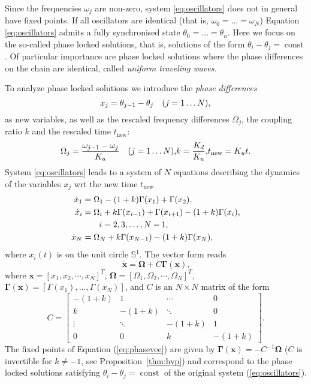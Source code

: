\documentclass[aps,pre,twocolumn,a4paper,showkeys,showpacs]{revtex4}\usepackage{color}
\theoremstyle{plain}
\theoremstyle{plain}
\begin{document}
\label{sec:phaselock}Since the frequencies $\omega_{j}$ are non-zero, system
\eqref{eq:oscillators} does not in general have fixed points. If all
oscillators are identical (that is, $\omega_{0}=\ldots=\omega_{N}$) Equation
\eqref{eq:oscillators} admits a fully synchronised state $\theta_{0}=\ldots=\theta_{n}$. Here we focus on the so-called phase locked solutions,
that is, solutions of the form $\theta_{i}-\theta_{j}=\operatorname{const}$.
Of particular importance are phase locked solutions where the phase
differences on the chain are identical, called \textit{uniform traveling
waves.}

To analyze phase locked solutions we introduce the \emph{phase differences}
\begin{equation}
x_{j}=\theta_{j-1}-\theta_{j}\mbox{\quad(\ensuremath{j=1\ldots N})},\label{eq:phasediff}\end{equation}
as new variables, as well as the rescaled frequency differences $\Omega_{j}$,
the coupling ratio $k$ and the rescaled time $t_{\mathrm{new}}$:
\[
\Omega_{j}=\frac{\omega_{j-1}-\omega_{j}}{K_{u}}\mbox{\quad(\ensuremath{j=1\ldots
N}),}k=\frac{K_{d}}{K_{u}}\mbox{,}t_{\mathrm{new}}=K_{u}t\mbox{.}
\]
System \eqref{eq:oscillators} leads to a system of $N$ equations describing
the dynamics of the variables $x_{j}$ wrt the new time $t_{\mathrm{new}}$
\begin{equation}\begin{split}
\dot{x}_{1} &  =\Omega_{1}-(1+k)\Gamma(x_{1})+\Gamma(x_{2})\mbox{,}\\
\dot{x}_{i} &  =\Omega_{i}+k\Gamma(x_{i-1})+\Gamma(x_{i+1})-(1+k)\Gamma
(x_{i})\mbox{,}\\
&  \mbox{\qquad\ensuremath{i=2,3,\dots,N-1},}\\
\dot{x}_{N} &  =\Omega_{N}+k\Gamma(x_{N-1})-(1+k)\Gamma(x_{N})\mbox{,}
\end{split}
\label{eq:phase}\end{equation}
where $x_{i}(t)$ is on the unit circle $\mathbb{S}^{1}$. The vector form
reads
\begin{equation}
\dot{\mathbf{x}}=\mathbf{\Omega}+C\mathbf{\boldsymbol{\Gamma}}(\mathbf{x})\mbox{,}\label{eq:phasevec}\end{equation}
where $\mathbf{x}=[x_{1},x_{2},\cdots,x_{N}]^{T}$, $\mathbf{\Omega}=[\Omega_{1},\Omega_{2},\cdots,\Omega_{N}]^{T}$, $\mathbf{\boldsymbol{\Gamma}}(\mathbf{x})=[\Gamma(x_{1}),\ldots,\Gamma(x_{N})]$, and $C$ is an $N\times N$
matrix of the form
\begin{equation}
C=\begin{bmatrix}
-(1+k) & 1 & \cdots & 0\\
k & -(1+k) & \ddots & 0\\
\vdots & \ddots & -(1+k) & 1\\
0 & 0 & k & -(1+k)
\end{bmatrix}
.\label{eq:-1}\end{equation}
The fixed points of Equation (\ref{eq:phasevec}) are given by $\mathbf{\Gamma
}(\mathbf{x})=-C^{-1}\mathbf{\mathbf{\Omega}}$ ($C$ is invertible for
$k\neq-1$, see Proposition~\ref{thm:hyp}) and correspond to the phase locked
solutions satisfying $\theta_{i}-\theta_{j}=\operatorname{const}$ of the
original system (\ref{eq:oscillators}).
\end{document}
